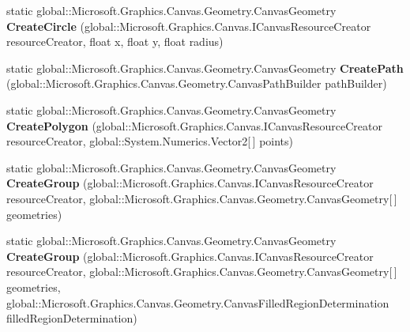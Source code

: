 \begin{DoxyCompactItemize}
\item 
\mbox{\label{class_microsoft_1_1_graphics_1_1_canvas_1_1_geometry_1_1_canvas_geometry_aa92a58291260e1f96f156e7d47e03c3d}} 
static global\+::\+Microsoft.\+Graphics.\+Canvas.\+Geometry.\+Canvas\+Geometry {\bfseries Create\+Circle} (global\+::\+Microsoft.\+Graphics.\+Canvas.\+I\+Canvas\+Resource\+Creator resource\+Creator, float x, float y, float radius)
\item 
\mbox{\label{class_microsoft_1_1_graphics_1_1_canvas_1_1_geometry_1_1_canvas_geometry_a7a89ba595e7afee0fe55e1dd7c7c4315}} 
static global\+::\+Microsoft.\+Graphics.\+Canvas.\+Geometry.\+Canvas\+Geometry {\bfseries Create\+Path} (global\+::\+Microsoft.\+Graphics.\+Canvas.\+Geometry.\+Canvas\+Path\+Builder path\+Builder)
\item 
\mbox{\label{class_microsoft_1_1_graphics_1_1_canvas_1_1_geometry_1_1_canvas_geometry_a1f5119d034d404cb9dc30ac067fcc1d1}} 
static global\+::\+Microsoft.\+Graphics.\+Canvas.\+Geometry.\+Canvas\+Geometry {\bfseries Create\+Polygon} (global\+::\+Microsoft.\+Graphics.\+Canvas.\+I\+Canvas\+Resource\+Creator resource\+Creator, global\+::\+System.\+Numerics.\+Vector2\mbox{[}$\,$\mbox{]} points)
\item 
\mbox{\label{class_microsoft_1_1_graphics_1_1_canvas_1_1_geometry_1_1_canvas_geometry_a9905813ee5fbbed32289fa93a3ecaed8}} 
static global\+::\+Microsoft.\+Graphics.\+Canvas.\+Geometry.\+Canvas\+Geometry {\bfseries Create\+Group} (global\+::\+Microsoft.\+Graphics.\+Canvas.\+I\+Canvas\+Resource\+Creator resource\+Creator, global\+::\+Microsoft.\+Graphics.\+Canvas.\+Geometry.\+Canvas\+Geometry\mbox{[}$\,$\mbox{]} geometries)
\item 
\mbox{\label{class_microsoft_1_1_graphics_1_1_canvas_1_1_geometry_1_1_canvas_geometry_a1af065a42d2349de0898d7f63c2af94a}} 
static global\+::\+Microsoft.\+Graphics.\+Canvas.\+Geometry.\+Canvas\+Geometry {\bfseries Create\+Group} (global\+::\+Microsoft.\+Graphics.\+Canvas.\+I\+Canvas\+Resource\+Creator resource\+Creator, global\+::\+Microsoft.\+Graphics.\+Canvas.\+Geometry.\+Canvas\+Geometry\mbox{[}$\,$\mbox{]} geometries, global\+::\+Microsoft.\+Graphics.\+Canvas.\+Geometry.\+Canvas\+Filled\+Region\+Determination filled\+Region\+Determination)

\end{DoxyCompactItemize}
